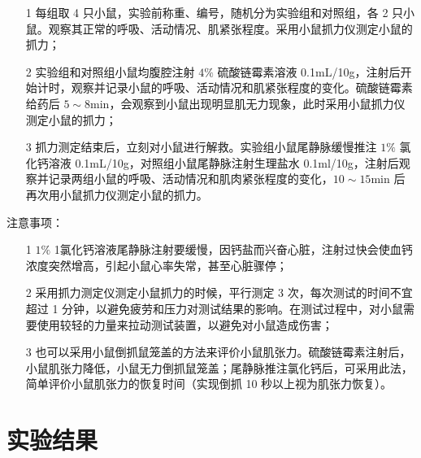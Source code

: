 \documentclass[UTF8]{ctexart}
\begin{document}
\begin{itemize}
    \item [1] 每组取 4 只小鼠，实验前称重、编号，随机分为实验组和对照组，各 2 只小鼠。观察其正常的呼吸、活动情况、肌紧张程度。采用小鼠抓力仪测定小鼠的抓力；
    \item [2] 实验组和对照组小鼠均腹腔注射 $4\%$ 硫酸链霉素溶液 0.1mL/10g，注射后开始计时，观察并记录小鼠的呼吸、活动情况和肌紧张程度的变化。硫酸链霉素给药后 $5\sim 8\text{min}$，会观察到小鼠出现明显肌无力现象，此时采用小鼠抓力仪测定小鼠的抓力；
    \item [3] 抓力测定结束后，立刻对小鼠进行解救。实验组小鼠尾静脉缓慢推注 $1\%$ 氯化钙溶液 0.1mL/10g，对照组小鼠尾静脉注射生理盐水 0.1ml/10g，注射后观察并记录两组小鼠的呼吸、活动情况和肌肉紧张程度的变化，$10\sim 15\text{min}$ 后再次用小鼠抓力仪测定小鼠的抓力。
\end{itemize}

注意事项：

\begin{itemize}
    \item [1] $1\%$ 1氯化钙溶液尾静脉注射要缓慢，因钙盐而兴奋心脏，注射过快会使血钙浓度突然增高，引起小鼠心率失常，甚至心脏骤停；
    \item [2] 采用抓力测定仪测定小鼠抓力的时候，平行测定 3 次，每次测试的时间不宜超过 1 分钟，以避免疲劳和压力对测试结果的影响。在测试过程中，对小鼠需要使用较轻的力量来拉动测试装置，以避免对小鼠造成伤害；
    \item [3] 也可以采用小鼠倒抓鼠笼盖的方法来评价小鼠肌张力。硫酸链霉素注射后，小鼠肌张力降低，小鼠无力倒抓鼠笼盖；尾静脉推注氯化钙后，可采用此法，简单评价小鼠肌张力的恢复时间（实现倒抓 10 秒以上视为肌张力恢复）。
\end{itemize}

\section{实验结果}
\end{document}
